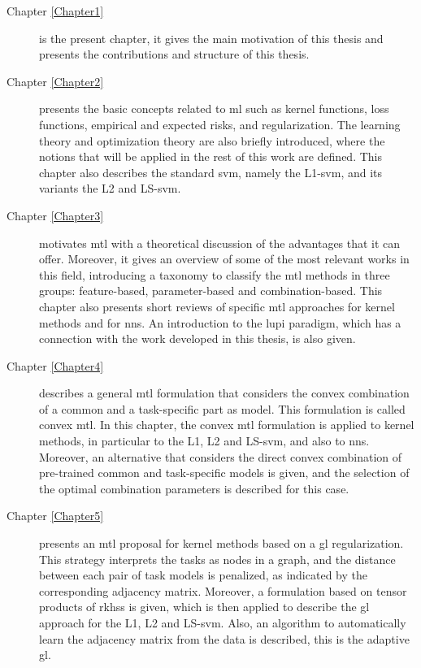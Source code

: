 \begin{description}

\item [{Chapter \ref{Chapter1}}] is the present chapter, it gives the main motivation of this thesis and presents the contributions and structure of this thesis.

\item [{Chapter \ref{Chapter2}}] presents the basic concepts related to \acrshort{ml} such as kernel functions, loss functions, empirical and expected risks, and regularization. The learning theory and optimization theory are also briefly introduced, where the notions that will be applied in the rest of this work are defined. This chapter also describes the standard \acrshort{svm}, namely the L1-\acrshort{svm}, and its variants the L2 and LS-\acrshort{svm}.

\item [{Chapter \ref{Chapter3}}] motivates \acrshort{mtl} with a theoretical discussion of the advantages that it can offer. Moreover, it gives an overview of some of the most relevant works in this field, introducing a taxonomy to classify the \acrshort{mtl} methods in three groups: feature-based, parameter-based and combination-based. This chapter also presents short reviews of specific \acrshort{mtl} approaches for kernel methods and for \acrshort{nns}. An introduction to the \acrfull{lupi} paradigm, which has a connection with the work developed in this thesis, is also given. 

\item [{ Chapter \ref{Chapter4}}] describes a general \acrshort{mtl} formulation that considers the convex combination of a common and a task-specific part as model. This formulation is called convex \acrshort{mtl}. In this chapter, the convex \acrshort{mtl} formulation is applied to kernel methods, in particular to the L1, L2 and LS-\acrshort{svm}, and also to \acrshort{nns}. Moreover, an alternative that considers the direct convex combination of pre-trained common and task-specific models is given, and the selection of the optimal combination parameters is described for this case.

\item [{ Chapter \ref{Chapter5}}] presents an \acrshort{mtl} proposal for kernel methods based on a \acrfull{gl} regularization. This strategy interprets the tasks as nodes in a graph, and the distance between each pair of task models is penalized, as indicated by the corresponding adjacency matrix. Moreover, a formulation based on tensor products of \acrfull{rkhss} is given, which is then applied to describe the \acrshort{gl} approach for the L1, L2 and LS-\acrshort{svm}. Also, an algorithm to automatically learn the adjacency matrix from the data is described, this is the adaptive \acrshort{gl}. 


\end{description}
